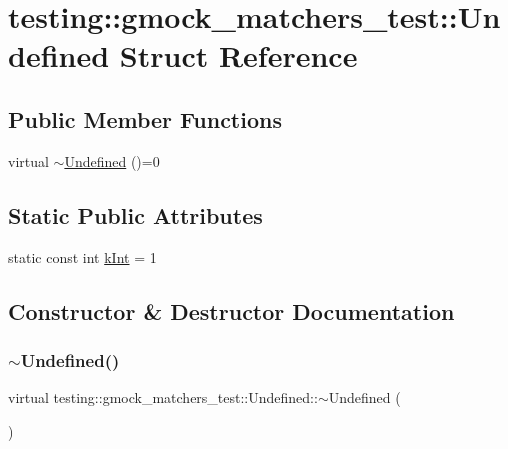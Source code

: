 \hypertarget{structtesting_1_1gmock__matchers__test_1_1Undefined}{}\section{testing\+::gmock\+\_\+matchers\+\_\+test\+::Undefined Struct Reference}
\label{structtesting_1_1gmock__matchers__test_1_1Undefined}
\subsection*{Public Member Functions}
\begin{DoxyCompactItemize}
\item 
virtual \mbox{\hyperlink{structtesting_1_1gmock__matchers__test_1_1Undefined_ace5b68909eae7b32971299176fabae94}{$\sim$\+Undefined}} ()=0
\end{DoxyCompactItemize}
\subsection*{Static Public Attributes}
\begin{DoxyCompactItemize}
\item 
static const int \mbox{\hyperlink{structtesting_1_1gmock__matchers__test_1_1Undefined_a59bddeb8647abbf50ee51b8ca8f0989b}{k\+Int}} = 1
\end{DoxyCompactItemize}


\subsection{Constructor \& Destructor Documentation}
\mbox{\label{structtesting_1_1gmock__matchers__test_1_1Undefined_ace5b68909eae7b32971299176fabae94}} 
\subsubsection{\texorpdfstring{$\sim$Undefined()}{~Undefined()}}
{\footnotesize\ttfamily virtual testing\+::gmock\+\_\+matchers\+\_\+test\+::\+Undefined\+::$\sim$\+Undefined (\begin{DoxyParamCaption}{ }\end{DoxyParamCaption})\hspace{0.3cm}{\ttfamily [pure virtual]}}



